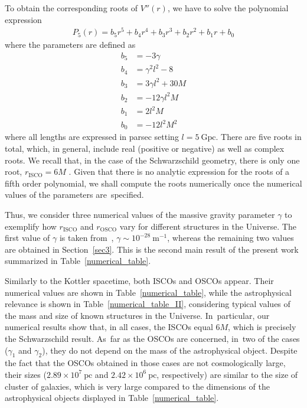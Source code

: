 \documentclass[aps,amsmath,amssymb,twocolumn]{revtex4}
\begin{document}
To obtain the corresponding roots of $V''(r)$, we have to solve the polynomial expression
%
\begin{align}
P_5(r) = b_5 r^5 + b_4 r^4 + b_3 r^3 + b_2 r^2 + b_1 r + b_0 
\end{align}
%
where the parameters are defined as 
%
\begin{align}
b_5 &=-3 \gamma
\\
b_4 &=\gamma ^2 l^2-8
\\
b_3 &=3 \gamma  l^2+30 M
\\
b_2 &=-12 \gamma  l^2 M
\\
b_1 &=2 l^2 M
\\
b_0 &=-12 l^2 M^2
\end{align}
%
where all lengths are expressed in parsec setting $l=5~\text{Gpc}$. There are five roots in total, which, in general, include real (positive or negative) as well as complex roots. We recall 
that, in the case of the Schwarzschild geometry, there is only one root, $r_{\text{ISCO}}=6 M$ \cite{Boonserm:2019nqq}. Given 
that there is no analytic expression for the roots of a fifth order polynomial, we shall compute the roots numerically once the numerical values of the parameters are~specified. 

Thus, we consider three numerical values of the massive gravity parameter $\gamma$ to exemplify how $r_{\text{ISCO}}$ and $r_{\text{OSCO}}$ vary for different structures in the Universe.
The first value of $\gamma$ is taken from~\cite{Panpanich:2018cxo}, $\gamma \sim 10^{-28}~\text{m}^{-1}$, whereas the remaining 
two values are obtained  in Section~\ref{sec3}. This is the second main result of the present work summarized in Table~\ref{numerical_table}.





Similarly to the Kottler spacetime, both ISCOs and OSCOs appear. Their numerical values are shown in Table~\ref{numerical_table}, while the astrophysical relevance is shown in Table~\ref{numerical_table_II}, considering typical values of the mass and size of known structures in the Universe. In~particular, our numerical results show that, in all cases, the ISCOs equal $6M$, which is precisely the Schwarzschild result. As~far as the OSCOs are concerned, in~two of the cases ($\gamma_1$ and $\gamma_2$), they do not depend on the mass of the astrophysical object. Despite the fact that the OSCOs obtained in those cases are not cosmologically large, their sizes ($2.89 \times 10^{7}~\text{pc}$ and $2.42 \times 10^{6}~\text{pc}$, respectively) are similar to the size of cluster of galaxies, which is very large compared to the dimensions of the astrophysical objects displayed in Table~\ref{numerical_table}.
\end{document}
